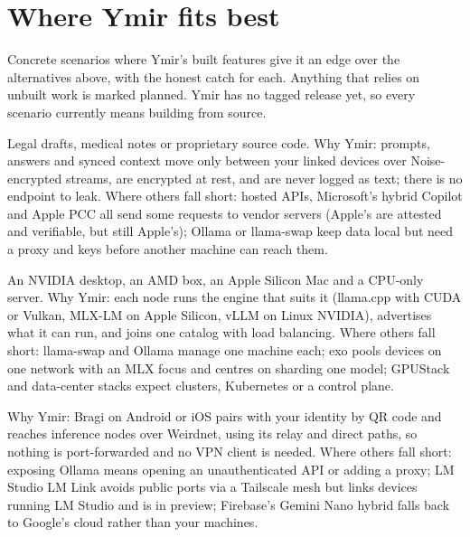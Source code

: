 \section{Where Ymir fits best}\label{sec:fit}

Concrete scenarios where Ymir's built features give it an edge over the alternatives above, with
the honest catch for each. Anything that relies on unbuilt work is marked planned. Ymir has no
tagged release yet, so every scenario currently means building from source.

\begin{rowlist}
  \item[1. Privacy-sensitive work on hardware you own \status{Built}]
  Legal drafts, medical notes or proprietary source code. Why Ymir: prompts, answers and synced context move only between your linked devices over Noise-encrypted streams, are encrypted at rest, and are never logged as text; there is no endpoint to leak. Where others fall short: hosted APIs, Microsoft's hybrid Copilot and Apple PCC all send some requests to vendor servers (Apple's are attested and verifiable, but still Apple's); Ollama or llama-swap keep data local but need a proxy and keys before another machine can reach them.

  \item[2. A home lab of mismatched machines \status{Built}]
  An NVIDIA desktop, an AMD box, an Apple Silicon Mac and a CPU-only server. Why Ymir: each node runs the engine that suits it (llama.cpp with CUDA or Vulkan, MLX-LM on Apple Silicon, vLLM on Linux NVIDIA), advertises what it can run, and joins one catalog with load balancing. Where others fall short: llama-swap and Ollama manage one machine each; exo pools devices on one network with an MLX focus and centres on sharding one model; GPUStack and data-center stacks expect clusters, Kubernetes or a control plane.

  \item[3. Your phone on your home GPUs, with no ports or VPN to run \status{Built}]
  Why Ymir: Bragi on Android or iOS pairs with your identity by QR code and reaches inference nodes over Weirdnet, using its relay and direct paths, so nothing is port-forwarded and no VPN client is needed. Where others fall short: exposing Ollama means opening an unauthenticated API or adding a proxy; LM Studio LM Link avoids public ports via a Tailscale mesh but links devices running LM Studio and is in preview; Firebase's Gemini Nano hybrid falls back to Google's cloud rather than your machines.


\end{rowlist}

